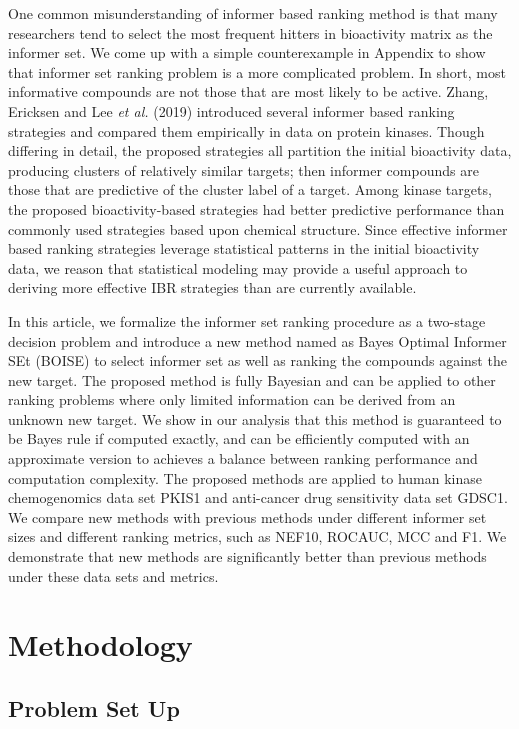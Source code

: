 \documentclass[12pt]{article}
\begin{document}
One common misunderstanding of informer based ranking method is that many researchers tend to select the most frequent hitters in bioactivity matrix as the informer set. We come up with a simple counterexample in Appendix to show that informer set ranking problem is a more complicated problem. In short, most informative compounds are not those that are most likely to be active. Zhang, Ericksen and Lee {\em et al.} (2019) introduced several informer based ranking strategies and compared
them empirically in data on protein kinases. Though differing in detail,
the proposed strategies all partition the initial
bioactivity data, producing  clusters of relatively similar targets; 
then informer compounds are  those that are predictive of the cluster label of a target.  Among kinase targets, the proposed bioactivity-based strategies had better predictive
performance than commonly used strategies based upon chemical
structure.   Since effective informer based ranking strategies leverage statistical
patterns in the initial bioactivity data, we reason that
statistical modeling may provide a useful approach to deriving
more effective IBR strategies than are currently available. 

In this article, we formalize the informer set ranking procedure as a two-stage decision problem and introduce a new method named as Bayes Optimal Informer SEt (BOISE) to select informer set as well as ranking the compounds against the new target.  The proposed method is fully Bayesian and can be applied to other ranking problems where only limited information can be derived from an unknown new target. We show in our analysis that this method is guaranteed to be Bayes rule if computed exactly, and can be efficiently computed with an approximate version to achieves a balance between ranking performance and computation complexity.  The proposed methods are applied to human  kinase  chemogenomics  data  set PKIS1 and anti-cancer drug sensitivity data set GDSC1. We compare new methods with previous methods under different informer set sizes and different ranking metrics, such as NEF10, ROCAUC, MCC and F1. We demonstrate that new methods are significantly better than previous methods under these data sets and metrics.


\section{Methodology}

\subsection{Problem Set Up}
\end{document}
